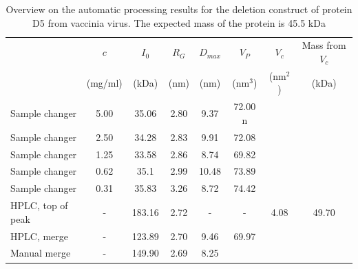\documentclass[preprint,pdf]{iucr}              %
\begin{document}
\begin{table}
\begin{tabular}{ l c | c c c c c c }
   & $c$  & $I_{0}$  & $R_{G}$ & $D_{max}$ & $V_{P}$ & $V_{c}$ & Mass from $V_{c}$\\
	 &  (mg/ml) & (kDa) & (nm)&  (nm)&  (nm$^{3}$) & (nm$^{2}$) & (kDa)\\
\hline
Sample changer & 5.00  & 35.06 & 2.80 & 9.37  & 72.00 n& &  \\
Sample changer & 2.50  & 34.28 & 2.83  & 9.91  & 72.08 & &  \\
Sample changer & 1.25 & 33.58& 2.86  & 8.74  & 69.82 & &  \\
Sample changer & 0.62  & 35.1& 2.99  & 10.48 & 73.89 & &  \\
Sample changer & 0.31 & 35.83  & 3.26  & 8.72  & 74.42& &  \\
HPLC, top of peak & - & 183.16 & 2.72  & -  & - & 4.08 & 49.70 \\
HPLC, merge & - & 123.89 & 2.70  & 9.46 & 69.97 & &  \\
Manual merge & - &  149.90 & 2.69 & 8.25 & & &  \\
\end{tabular}
\caption{Overview on the automatic processing results for the deletion construct of protein D5 from vaccinia virus. 
The expected mass of the protein is 45.5 kDa}
\label{tbl:results}
\end{table}
\end{document}
